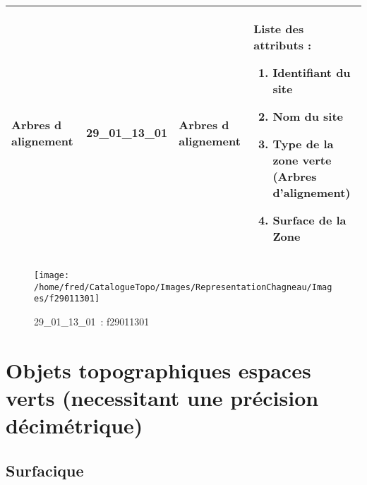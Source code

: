 \documentclass[12pt,titlepage]{book}
\begin{document}
\renewcommand{\arraystretch}{1.2}
\begin{supertabular}{|p{10cm}|c|p{13cm}|p{12cm}|}
 Arbres d alignement & 29\_01\_13\_01 & Arbres d alignement & Liste des attributs :
\begin{enumerate}
  \item Identifiant du site  \item Nom du site  \item Type de la zone verte (Arbres d'alignement)  \item Surface de la Zone\end{enumerate}
\\
\hline
\end{supertabular}
\begin{figure}[h!]
  \hfill         %
  \begin{minipage}[t]{3cm}
    \begin{center}
      \texttt{[image: /home/fred/CatalogueTopo/Images/RepresentationChagneau/Images/f29011301]}
      \caption[~29\_01\_13\_01]{\small{29\_01\_13\_01~:} \tiny{f29011301}}\label{f29011301}
    \end{center}
  \end{minipage}
\end{figure}

\section{\large Objets topographiques espaces verts (necessitant une précision décimétrique)}
\subsection{Surfacique}
\noindent
\vspace{\baselineskip}
\end{document}
